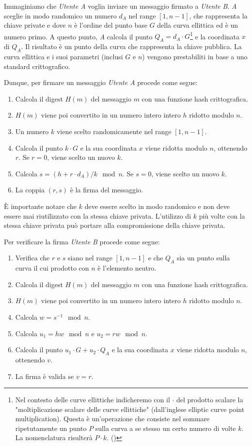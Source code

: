 Immaginiamo che \emph{Utente A} voglia inviare un messaggio firmato a \emph{Utente B}.
\emph{A} sceglie in modo randomico un numero $d_A$ nel range $[1, n-1]$, che rappresenta la chiave private e dove $n$ è l'ordine del punto base $G$ della curva ellittica ed è un numero primo.
A questo punto, \emph{A} calcola il punto $Q_A = d_A \cdot G$\footnote{Nel contesto delle curve ellittiche indicheremo con il $\cdot$ del prodotto scalare la "moltiplicazione scalare delle curve ellittiche" (dall'inglese elliptic curve point multiplication). Questa è un'operazione che consiste nel sommare ripetutamente un punto $P$ sulla curva a se stesso un certo numero di volte $k$. La nomenclatura risulterà $P \cdot k$. (\cite{site:ec-point-multiplication})} e la coordinata $x$ di $Q_A$. Il risultato è un punto della curva che rappresenta la chiave pubblica.
La curva ellittica e i suoi parametri (inclusi $G$ e $n$) vengono prestabiliti in base a uno standard crittografico.

\noindent Dunque, per firmare un messaggio \emph{Utente A} procede come segue:
\begin{enumerate}
	\item Calcola il digest $H(m)$ del messaggio $m$ con una funzione hash crittografica.
	\item $H(m)$ viene poi convertito in un numero intero intero $h$ ridotto modulo $n$.
	\item Un numero $k$ viene scelto randomicamente nel range $[1, n-1]$.
	\item Calcola il punto $k \cdot G$ e la sua coordinata $x$ viene ridotta modulo $n$, ottenendo $r$. Se $r = 0$, viene scelto un nuovo $k$.
	\item Calcola $s = (h + r \cdot d_A)/k \mod n$. Se $s = 0$, viene scelto un nuovo $k$.
	\item La coppia $(r, s)$ è la firma del messaggio.
\end{enumerate}

\noindent È importante notare che $k$ deve essere scelto in modo randomico e non deve essere mai riutilizzato con la stessa chiave privata.
L'utilizzo di $k$ più volte con la stessa chiave privata può portare alla compromissione della chiave privata.

\noindent Per verificare la firma \emph{Utente B} procede come segue:
\begin{enumerate}
	\item Verifica che $r$ e $s$ siano nel range $[1, n-1]$ e che $Q_A$ sia un punto sulla curva il cui prodotto con $n$ è l'elemento neutro.
	\item Calcola il digest $H(m)$ del messaggio $m$ con una funzione hash crittografica.
	\item $H(m)$ viene poi convertito in un numero intero intero $h$ ridotto modulo $n$.
	\item Calcola $w = s^{-1} \mod n$.
	\item Calcola $u_1 = hw \mod n$ e $u_2 = rw \mod n$.
	\item Calcola il punto $u_1 \cdot G + u_2 \cdot Q_A$ e la sua coordinata $x$ viene ridotta modulo $n$, ottenendo $v$.
	\item La firma è valida se $v = r$.
\end{enumerate}

